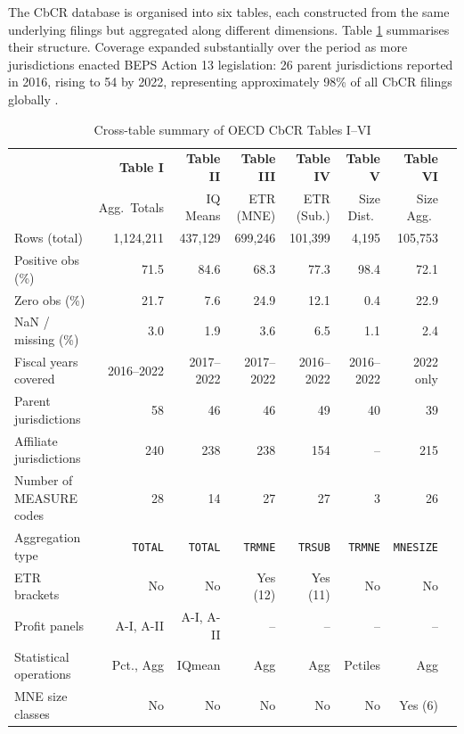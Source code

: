 \documentclass[11pt,a4paper]{article}
\newcommand{\code}[1]{\texttt{#1}}
\begin{document}
The CbCR database is organised into six tables, each constructed from the same underlying filings but aggregated along different dimensions. Table \ref{tab:crosssummary} summarises their structure. Coverage expanded substantially over the period as more jurisdictions enacted BEPS Action 13 legislation: 26 parent jurisdictions reported in 2016, rising to 54 by 2022, representing approximately 98\% of all CbCR filings globally \citep{oecd2025a}.

\begin{table}[H]
\centering
\caption{Cross-table summary of OECD CbCR Tables I--VI}
\label{tab:crosssummary}
\footnotesize
\begin{tabular}{@{}lrrrrrrr@{}}
\toprule
 & \textbf{Table I} & \textbf{Table II} & \textbf{Table III} & \textbf{Table IV} & \textbf{Table V} & \textbf{Table VI} \\
 & Agg.\ Totals & IQ Means & ETR (MNE) & ETR (Sub.) & Size Dist.\ & Size Agg.\ \\
\midrule
Rows (total) & 1,124,211 & 437,129 & 699,246 & 101,399 & 4,195 & 105,753 \\
Positive obs (\%) & 71.5 & 84.6 & 68.3 & 77.3 & 98.4 & 72.1 \\
Zero obs (\%) & 21.7 & 7.6 & 24.9 & 12.1 & 0.4 & 22.9 \\
NaN / missing (\%) & 3.0 & 1.9 & 3.6 & 6.5 & 1.1 & 2.4 \\
\addlinespace
Fiscal years covered & 2016--2022 & 2017--2022 & 2017--2022 & 2016--2022 & 2016--2022 & 2022 only \\
Parent jurisdictions & 58 & 46 & 46 & 49 & 40 & 39 \\
Affiliate jurisdictions & 240 & 238 & 238 & 154 & -- & 215 \\
Number of MEASURE codes & 28 & 14 & 27 & 27 & 3 & 26 \\
\addlinespace
Aggregation type & \code{TOTAL} & \code{TOTAL} & \code{TRMNE} & \code{TRSUB} & \code{TRMNE} & \code{MNESIZE} \\
ETR brackets & No & No & Yes (12) & Yes (11) & No & No \\
Profit panels & A-I, A-II & A-I, A-II & -- & -- & -- & -- \\
Statistical operations & Pct., Agg & IQmean & Agg & Agg & Pctiles & Agg \\
MNE size classes & No & No & No & No & No & Yes (6) \\
\bottomrule
\end{tabular}
\end{table}
\end{document}
